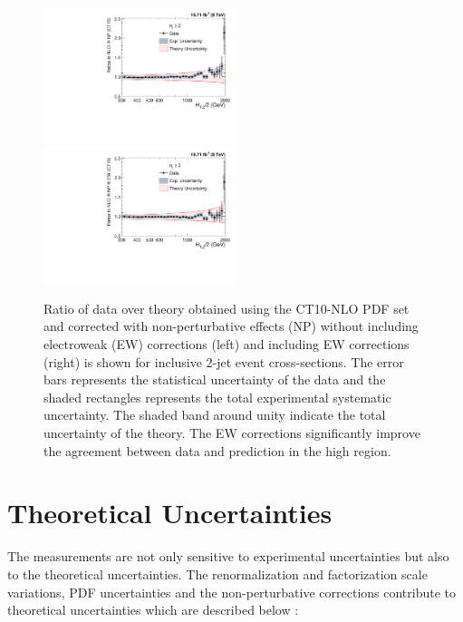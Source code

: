 \begin{figure}[!h]
 \begin{center}
 \hspace*{-5mm}\includegraphics[width=0.5\textwidth]{Plots_HT_2_150/Comparison_data_NLO_2_NoEW.pdf}
 ~~\includegraphics[width=0.5\textwidth]{Plots_HT_2_150/Comparison_data_NLO_2_EW.pdf}
 \caption[Ratio of data over theory obtained using the CT10-NLO PDF set.]{Ratio of data over theory obtained using the CT10-NLO PDF set and corrected with non-perturbative effects (NP) without including electroweak (EW) corrections (left) and including EW corrections (right) is shown for inclusive 2-jet event cross-sections. The error bars represents the statistical uncertainty of the data and the shaded rectangles represents the total experimental systematic uncertainty. The shaded band around unity indicate the total uncertainty of the theory. The EW corrections significantly improve the agreement between data and prediction in the high \httwo region.}
 \label{fig:EW_Comp}
 \end{center}
\end{figure}

\section{Theoretical Uncertainties}
\label{sec:theory_unc}
The measurements are not only sensitive to experimental uncertainties but also to the theoretical uncertainties. The renormalization and factorization scale variations, PDF uncertainties and the non-perturbative corrections contribute to theoretical uncertainties which are described below : 

